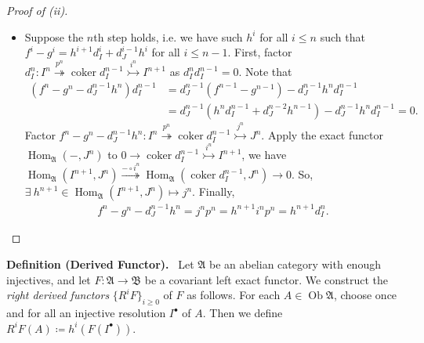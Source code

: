 \documentclass[11pt,a4paper,footinclude=true,headinclude=true]{scrbook} %
\DeclareMathOperator{\Hom}{Hom}
\DeclareMathOperator{\Coker}{coker}
\DeclareMathOperator{\Ob}{Ob}
\newcommand{\Af}{\mathfrak{A}}
\newcommand{\Bf}{\mathfrak{B}}
\newcommand{\<}{\langle}
\newcommand{\>}{\rangle}
\newenvironment{definition}[2][Definition]
    { \begin{mdframed}[backgroundcolor=gray!20] \textbf{#1 #2.}\ }
    {  \end{mdframed}}
\begin{document}
\begin{proof}[Proof of (ii)]
\begin{itemize}
        \begin{align*}
            f^0-g^0=j^0p^0=h^1i^0p^0=h^1d_I^0.
        \end{align*}
        \item Suppose the $n$th step holds, i.e. we have such $h^i$ for all $i\leq n$ such that $f^i-g^i=h^{i+1}d_I^i+d_J^{i-1}h^i$ for all $i\leq n-1$. First, factor $d_I^n:I^n\overset{p^n}{\twoheadrightarrow}\Coker d_I^{n-1}\overset{i^n}{\rightarrowtail}I^{n+1}$ as $d_I^nd_I^{n-1}=0$. Note that
        \begin{align*}
            (f^n-g^n-d_J^{n-1}h^n)d_I^{n-1} &=d_J^{n-1}(f^{n-1}-g^{n-1})-d_J^{n-1}h^nd_I^{n-1}\\
            &=d_J^{n-1}(h^nd_I^{n-1}+d_J^{n-2}h^{n-1})-d_J^{n-1}h^nd_I^{n-1}=0.
        \end{align*}
        Factor $f^n-g^n-d_J^{n-1}h^n:I^n\overset{p^n}{\twoheadrightarrow}\Coker d_I^{n-1}\overset{j^n}{\rightarrowtail}J^n$. Apply the exact functor $\Hom_\Af(-,J^n)$ to $0\to\Coker d_I^{n-1}\overset{i^n}{\rightarrowtail}I^{n+1}$, we have $\Hom_\Af(I^{n+1},J^n)\overset{-\circ i^n}{\twoheadrightarrow}\Hom_\Af(\Coker d_I^{n-1},J^n)\to0$. So, $\exists\  h^{n+1}\in\Hom_\Af(I^{n+1},J^n)\mapsto j^n$. Finally,
        \begin{align*}
            f^n-g^n-d_J^{n-1}h^n=j^np^n=h^{n+1}i^np^n=h^{n+1}d_I^n.
        \end{align*}
    \end{itemize}
\end{proof}

\begin{definition}{(Derived Functor)}\newline
    Let $\Af$ be an abelian category with enough injectives, and let $F:\Af\to\Bf$ be a covariant left exact functor. We construct the \textit{right derived functors} $\{R^iF\}_{i\geq0}$ of $F$ as follows. For each $A\in\Ob\Af$, choose once and for all an injective resolution $I^\bullet$ of $A$. Then we define $R^iF(A)\coloneqq h^i(F(I^\bullet))$.
\end{definition}
\end{document}
